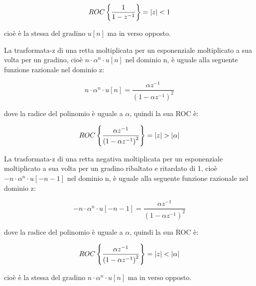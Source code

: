 {
    \Large 
    \begin{equation}
        ROC \left\{ \dfrac{1}{1 - z^{-1}} \right\} = \abs{z} < 1
    \end{equation}
}

cioè è la stessa del gradino $u \left[ n\right]$ ma in verso opposto. \newline 

La trasformata-z di una retta moltiplicata per un esponenziale moltiplicato a sua volta per un gradino, 
cioè $n \cdot \alpha^{n} \cdot  u \left[ n\right]$ nel dominio n, è uguale alla seguente funzione razionale nel dominio z: 

{
    \Large 
    \begin{equation}
        n \cdot \alpha^{n} \cdot  u \left[ n\right]
        = 
        \dfrac{\alpha z^{-1}}{\left( 1 - \alpha z^{-1}\right)^{2}}
    \end{equation}
}

dove la radice del polinomio è uguale a $\alpha$, quindi la sua ROC è: 

{
    \Large 
    \begin{equation}
        ROC \left\{ \dfrac{\alpha z^{-1}}{\left( 1 - \alpha z^{-1}\right)^{2}} \right\} 
        = 
        \abs{z} > \abs{\alpha}
    \end{equation}
}

\newpage 

La trasformata-z di una retta negativa moltiplicata per un esponenziale moltiplicato a sua volta per un gradino ribaltato e ritardato di 1, 
cioè $- n \cdot \alpha^{n} \cdot  u \left[ -n -1 \right]$ nel dominio n, è uguale alla seguente funzione razionale nel dominio z: 

{
    \Large 
    \begin{equation}
        -n \cdot \alpha^{n} \cdot  u \left[ -n - 1\right]
        = 
        \dfrac{\alpha z^{-1}}{\left( 1 - \alpha z^{-1}\right)^{2}}
    \end{equation}
}

dove la radice del polinomio è uguale a $\alpha$, quindi la sua ROC è: 

{
    \Large 
    \begin{equation}
        ROC \left\{ \dfrac{\alpha z^{-1}}{\left( 1 - \alpha z^{-1}\right)^{2}} \right\} 
        = 
        \abs{z} < \abs{\alpha}
    \end{equation}
}


cioè è la stessa del gradino $n \cdot \alpha^{n} \cdot  u \left[ n\right]$ ma in verso opposto. \newline 


